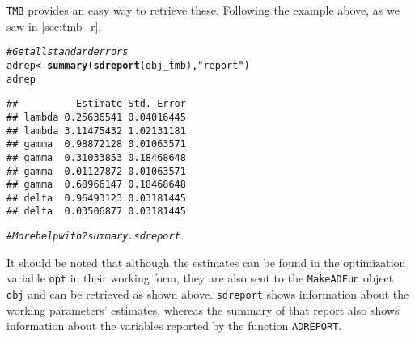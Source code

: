 \documentclass[bimj,fleqn]{w-art}\usepackage[]{graphicx}\usepackage[]{color}
\makeatletter
\newcommand{\hlstr}[1]{\textcolor[rgb]{0.192,0.494,0.8}{#1}}%
\newcommand{\hlcom}[1]{\textcolor[rgb]{0.678,0.584,0.686}{\textit{#1}}}%
\newcommand{\hlstd}[1]{\textcolor[rgb]{0.345,0.345,0.345}{#1}}%
\newcommand{\hlkwb}[1]{\textcolor[rgb]{0.69,0.353,0.396}{#1}}%
\newcommand{\hlkwd}[1]{\textcolor[rgb]{0.737,0.353,0.396}{\textbf{#1}}}%
\newenvironment{kframe}{%
 \def\at@end@of@kframe{}%
 \ifinner\ifhmode%
  \def\at@end@of@kframe{\end{minipage}}%
  \begin{minipage}{\columnwidth}%
 \fi\fi%
 \def\FrameCommand##1{\hskip\@totalleftmargin \hskip-\fboxsep
 \colorbox{shadecolor}{##1}\hskip-\fboxsep
     \hskip-\linewidth \hskip-\@totalleftmargin \hskip\columnwidth}%
 \MakeFramed {\advance\hsize-\width
   \@totalleftmargin\z@ \linewidth\hsize
   \@setminipage}}%
 {\par\unskip\endMakeFramed%
 \at@end@of@kframe}
\newenvironment{knitrout}{}{} %
\theoremstyle{plain}
\theoremstyle{definition}
\makeatother
\begin{document}
{\tt{TMB}} provides an easy way to retrieve these.
Following the example above, as we saw in \autoref{sec:tmb_r},
\begin{knitrout}
\color{fgcolor}\begin{kframe}
\begin{alltt}
\hlcom{# Get all standard errors}
\hlstd{adrep} \hlkwb{<-} \hlkwd{summary}\hlstd{(}\hlkwd{sdreport}\hlstd{(obj_tmb),} \hlstr{"report"}\hlstd{)}
\hlstd{adrep}
\end{alltt}
\begin{verbatim}
##          Estimate Std. Error
## lambda 0.25636541 0.04016445
## lambda 3.11475432 1.02131181
## gamma  0.98872128 0.01063571
## gamma  0.31033853 0.18468648
## gamma  0.01127872 0.01063571
## gamma  0.68966147 0.18468648
## delta  0.96493123 0.03181445
## delta  0.03506877 0.03181445
\end{verbatim}
\begin{alltt}
\hlcom{# More help with ?summary.sdreport}
\end{alltt}
\end{kframe}
\end{knitrout}
It should be noted that although the estimates can be found in the optimization variable \texttt{opt} in their working form, they are also sent to the \texttt{MakeADFun} object \texttt{obj} and can be retrieved as shown above.
\texttt{sdreport} shows information about the working parameters' estimates, whereas the summary of that report also shows information about the variables reported by the function \texttt{ADREPORT}.
\end{document}

